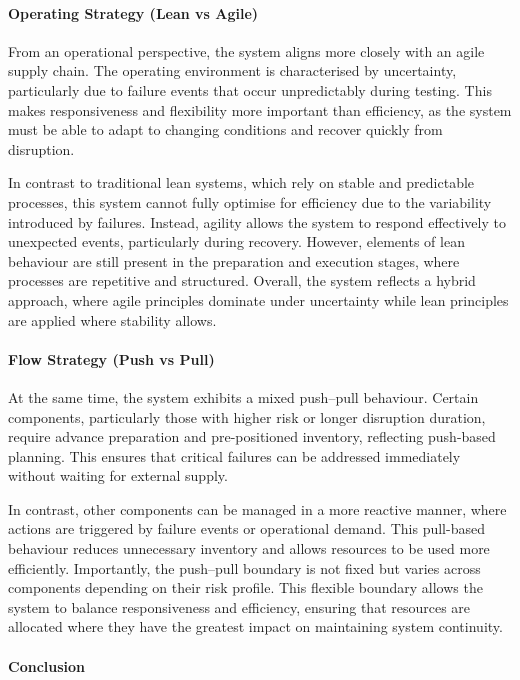 \paragraph{Operating Strategy (Lean vs Agile)}

From an operational perspective, the system aligns more closely with an agile supply chain. The operating environment is characterised by uncertainty, particularly due to failure events that occur unpredictably during testing. This makes responsiveness and flexibility more important than efficiency, as the system must be able to adapt to changing conditions and recover quickly from disruption.

In contrast to traditional lean systems, which rely on stable and predictable processes, this system cannot fully optimise for efficiency due to the variability introduced by failures. Instead, agility allows the system to respond effectively to unexpected events, particularly during recovery. However, elements of lean behaviour are still present in the preparation and execution stages, where processes are repetitive and structured. Overall, the system reflects a hybrid approach, where agile principles dominate under uncertainty while lean principles are applied where stability allows.

\paragraph{Flow Strategy (Push vs Pull)}

At the same time, the system exhibits a mixed push--pull behaviour. Certain components, particularly those with higher risk or longer disruption duration, require advance preparation and pre-positioned inventory, reflecting push-based planning. This ensures that critical failures can be addressed immediately without waiting for external supply.

In contrast, other components can be managed in a more reactive manner, where actions are triggered by failure events or operational demand. This pull-based behaviour reduces unnecessary inventory and allows resources to be used more efficiently. Importantly, the push--pull boundary is not fixed but varies across components depending on their risk profile. This flexible boundary allows the system to balance responsiveness and efficiency, ensuring that resources are allocated where they have the greatest impact on maintaining system continuity.

\paragraph{Conclusion}

